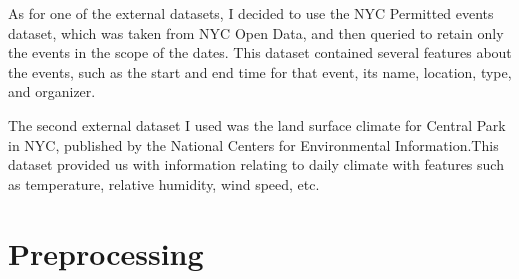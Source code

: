 \documentclass[11pt]{article}
\begin{document}
As for one of the external datasets, I decided to use the NYC Permitted events dataset, which was taken from NYC Open Data, and then queried to retain only the events in the scope of the dates.\cite{nyceventsdata} This dataset contained several features about the events, such as the start and end time for that event, its name, location, type, and organizer. 

The second external dataset I used was the land surface climate for Central Park in NYC, published by the National Centers for Environmental Information.\cite{nceidailydata}This dataset provided us with information relating to daily climate with features such as temperature, relative humidity, wind speed, etc.


\section{Preprocessing}
\end{document}
